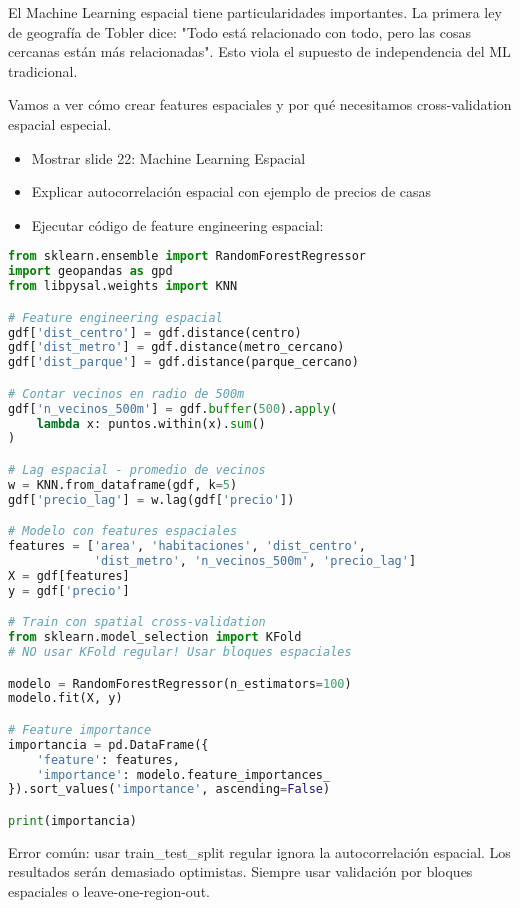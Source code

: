 \documentclass[11pt,a4paper]{article}
\newcommand{\decir}[1]{\begin{tcolorbox}[colback=blue!5,colframe=usachblue,title={DECIR}]#1\end{tcolorbox}}
\newcommand{\hacer}[1]{\begin{tcolorbox}[colback=green!5,colframe=green!50!black,title={HACER}]#1\end{tcolorbox}}
\newcommand{\alerta}[1]{\begin{tcolorbox}[colback=red!5,colframe=red,title={ALERTA}]#1\end{tcolorbox}}
\begin{document}
\decir{
El Machine Learning espacial tiene particularidades importantes. La primera ley de geografía de Tobler dice: "Todo está relacionado con todo, pero las cosas cercanas están más relacionadas". Esto viola el supuesto de independencia del ML tradicional.

Vamos a ver cómo crear features espaciales y por qué necesitamos cross-validation espacial especial.
}

\hacer{
\begin{itemize}
    \item Mostrar slide 22: Machine Learning Espacial
    \item Explicar autocorrelación espacial con ejemplo de precios de casas
    \item Ejecutar código de feature engineering espacial:
\end{itemize}
}

\begin{lstlisting}[language=Python]
from sklearn.ensemble import RandomForestRegressor
import geopandas as gpd
from libpysal.weights import KNN

# Feature engineering espacial
gdf['dist_centro'] = gdf.distance(centro)
gdf['dist_metro'] = gdf.distance(metro_cercano) 
gdf['dist_parque'] = gdf.distance(parque_cercano)

# Contar vecinos en radio de 500m
gdf['n_vecinos_500m'] = gdf.buffer(500).apply(
    lambda x: puntos.within(x).sum()
)

# Lag espacial - promedio de vecinos
w = KNN.from_dataframe(gdf, k=5)
gdf['precio_lag'] = w.lag(gdf['precio'])

# Modelo con features espaciales
features = ['area', 'habitaciones', 'dist_centro', 
            'dist_metro', 'n_vecinos_500m', 'precio_lag']
X = gdf[features]
y = gdf['precio']

# Train con spatial cross-validation
from sklearn.model_selection import KFold
# NO usar KFold regular! Usar bloques espaciales

modelo = RandomForestRegressor(n_estimators=100)
modelo.fit(X, y)

# Feature importance
importancia = pd.DataFrame({
    'feature': features,
    'importance': modelo.feature_importances_
}).sort_values('importance', ascending=False)

print(importancia)
\end{lstlisting}

\alerta{
Error común: usar train\_test\_split regular ignora la autocorrelación espacial. Los resultados serán demasiado optimistas. Siempre usar validación por bloques espaciales o leave-one-region-out.
}
\end{document}
